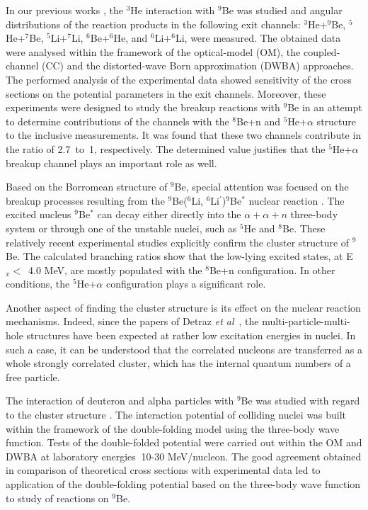 \documentclass[
11pt, %
english, %
onehalfspacing, %
headsepline, %
]{MastersDoctoralThesis} %
\begin{document}
In our previous works \cite{lukyanov2014, lukyanov2015, janseitov2018}, the ${}^3$He interaction with ${}^9$Be was studied and angular distributions of the reaction products in the following exit channels: ${}^3$He+$^9$Be, ${}^5$He+$^7$Be, ${}^5$Li+$^7$Li, ${}^6$Be+$^6$He, and ${}^6$Li+$^6$Li, were measured. The obtained data were analysed within the framework of the optical-model (OM), the coupled-channel (CC) and the distorted-wave Born approximation (DWBA) approaches. The performed analysis of the experimental data showed sensitivity of the cross sections on the potential parameters in the exit channels. Moreover, these experiments were designed to study the breakup reactions with ${}^9$Be in an attempt to determine contributions of the channels with the ${}^8$Be+n  and  ${}^5$He+$\alpha$ structure to the inclusive measurements. It was found that these two channels contribute in the ratio of 2.7~to~1, respectively. The determined value justifies that the ${}^5$He+$\alpha$ breakup channel plays an important role as well.

Based on the Borromean structure of ${}^9$Be, special attention was focused on the breakup processes resulting from the ${}^9$Be($^6$Li, ${}^6$Li$^\prime$)$^9$Be$^*$ nuclear reaction \cite{brown2007, papka2007}. The excited nucleus ${}^9$Be$^*$ can decay either directly into the $\alpha+\alpha+n$ three-body system or through one of the unstable nuclei, such as ${}^5$He and ${}^8$Be. These relatively recent experimental studies explicitly confirm the cluster structure of ${}^9$Be.
The calculated branching ratios show that the low-lying excited states, at E$_x <$~4.0 MeV, are mostly populated with the ${}^8$Be+n configuration. In other conditions, the ${}^5$He+$\alpha$ configuration plays a significant  role.

Another aspect of finding the cluster structure is its  effect on the nuclear reaction mechanisms. Indeed, since the papers of Detraz \textit{et al}~\cite{detraz1970, detraz1974}, the multi-particle-multi-hole structures have been expected at rather low excitation energies in nuclei. In such a case, it can be understood that the correlated nucleons are transferred as a whole strongly correlated cluster, which has the internal quantum numbers of a free particle.

The interaction of deuteron and alpha particles with ${}^9$Be was studied with regard to the cluster structure \cite{urazbekov2016, urazbekov2017}. The interaction potential of colliding nuclei was built within the framework of the double-folding model using the three-body wave function. Tests of the double-folded potential were carried out within the OM and DWBA at laboratory energies $~$10-30 MeV/nucleon. The good agreement obtained in comparison of theoretical cross sections with experimental data led to application of the double-folding potential based on the three-body wave function to study of reactions on $^9$Be.
\end{document}
